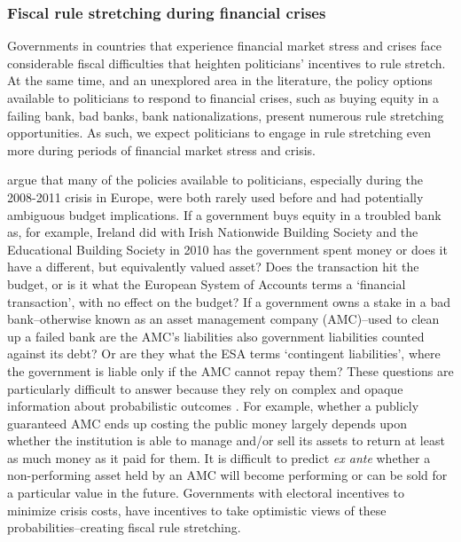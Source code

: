 \documentclass[]{article}
\begin{document}

\subsubsection{Fiscal rule stretching during financial crises}

Governments in countries that experience financial market stress and crises face considerable fiscal difficulties \cite[see][]{Laeven2012} that heighten politicians' incentives to rule stretch. At the same time, and an unexplored area in the literature, the policy options available to politicians to respond to financial crises, such as buying equity in a failing bank, bad banks, bank nationalizations, present numerous rule stretching opportunities. As such, we expect politicians to engage in rule stretching even more during periods of financial market stress and crisis.

\cite{GandrudHallerberg2016} argue that many of the policies available to politicians, especially during the 2008-2011 crisis in Europe, were both rarely used before and had potentially ambiguous budget implications. If a government buys equity in a troubled bank as, for example, Ireland did with Irish Nationwide Building Society and the Educational Building Society in 2010 has the government spent money or does it have a different, but equivalently valued asset? Does the transaction hit the budget, or is it what the European System of Accounts terms a `financial transaction', with no effect on the budget? If a government owns a stake in a bad bank--otherwise known as an asset management company (AMC)--used to clean up a failed bank are the AMC's liabilities also government liabilities counted against its debt? Or are they what the ESA terms `contingent liabilities', where the government is liable only if the AMC cannot repay them? These questions are particularly difficult to answer because they rely on complex and opaque information about probabilistic outcomes \citep{gandrudOkeeffe2016}. For example, whether a publicly guaranteed AMC ends up costing the public money largely depends upon whether the institution is able to manage and/or sell its assets to return at least as much money as it paid for them. It is difficult to predict \emph{ex ante} whether a non-performing asset held by an AMC will become performing or can be sold for a particular value in the future. Governments with electoral incentives to minimize crisis costs, have incentives to take optimistic views of these probabilities--creating fiscal rule stretching.
\end{document}
